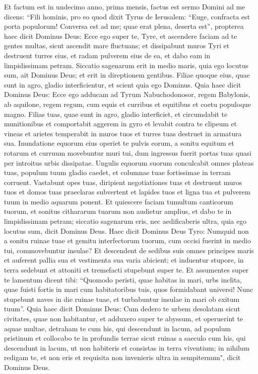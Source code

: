 \begin{biblechapter}  
\verse Et factum est in undecimo anno, prima mensis, factus est sermo Domini ad me dicens: 
\verse “Fili hominis, pro eo quod dixit Tyrus de Ierusalem: “Euge, confracta est porta populorum! Conversa est ad me; quae erat plena, deserta est”, 
\verse propterea haec dicit Dominus Deus: Ecce ego super te, Tyre, et ascendere faciam ad te gentes multas, sicut ascendit mare fluctuans; 
\verse et dissipabunt muros Tyri et destruent turres eius, et radam pulverem eius de ea, et dabo eam in limpidissimam petram. 
\verse Siccatio sagenarum erit in medio maris, quia ego locutus sum, ait Dominus Deus; et erit in direptionem gentibus. 
\verse Filiae quoque eius, quae sunt in agro, gladio interficientur, et scient quia ego Dominus. 
\verse Quia haec dicit Dominus Deus: Ecce ego adducam ad Tyrum Nabuchodonosor, regem Babylonis, ab aquilone, regem regum, cum equis et curribus et equitibus et coetu populoque magno. 
\verse Filias tuas, quae sunt in agro, gladio interficiet, et circumdabit te munitionibus et comportabit aggerem in gyro et levabit contra te clipeum 
\verse et vineas et arietes temperabit in muros tuos et turres tuas destruet in armatura sua. 
\verse Inundatione equorum eius operiet te pulvis eorum, a sonitu equitum et rotarum et curruum movebuntur muri tui, dum ingressus fuerit portas tuas quasi per introitus urbis dissipatae. 
\verse Ungulis equorum suorum conculcabit omnes plateas tuas, populum tuum gladio caedet, et columnae tuae fortissimae in terram corruent. 
\verse Vastabunt opes tuas, diripient negotiationes tuas et destruent muros tuos et domos tuas praeclaras subvertent et lapides tuos et ligna tua et pulverem tuum in medio aquarum ponent. 
\verse Et quiescere faciam tumultum canticorum tuorum, et sonitus cithararum tuarum non audietur amplius, 
\verse et dabo te in limpidissimam petram; siccatio sagenarum eris, nec aedificaberis ultra, quia ego locutus sum, dicit Dominus Deus. 
\verse Haec dicit Dominus Deus Tyro: Numquid non a sonitu ruinae tuae et gemitu interfectorum tuorum, cum occisi fuerint in medio tui, commovebuntur insulae?  
\verse Et descendent de sedibus suis omnes principes maris et auferent pallia sua et vestimenta sua varia abicient; et induentur stupore, in terra sedebunt et attoniti et tremefacti stupebunt super te. 
\verse Et assumentes super te lamentum dicent tibi: “Quomodo peristi, quae habitas in mari, urbs inclita, quae fuisti fortis in mari cum habitatoribus tuis, quos formidabant universi! 
\verse Nunc stupebunt naves in die ruinae tuae, et turbabuntur insulae in mari ob exitum tuum”. 
\verse Quia haec dicit Dominus Deus: Cum dedero te urbem desolatam sicut civitates, quae non habitantur, et adduxero super te abyssum, et operuerint te aquae multae, 
\verse detraham te cum his, qui descendunt in lacum, ad populum pristinum et collocabo te in profundis terrae sicut ruinas a saeculo cum his, qui descendunt in lacum, ut non habiteris et consistas in terra viventium;  
\verse in nihilum redigam te, et non eris et requisita non invenieris ultra in sempiternum", dicit Dominus Deus. 
\end{biblechapter}

